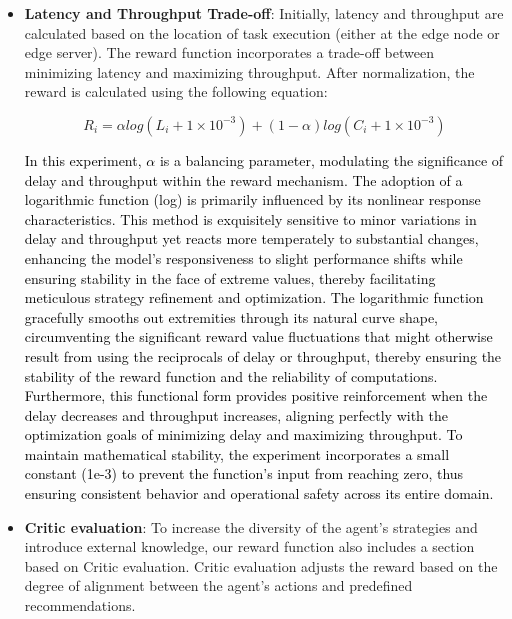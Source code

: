 \documentclass[preprint,12pt]{elsarticle}
\begin{document}
\begin{itemize}

    \item {\fontsize{11}{\baselineskip}\selectfont \textbf{Latency and Throughput Trade-off}}: Initially, latency and throughput are calculated based on the location of task execution (either at the edge node or edge server). The reward function incorporates a trade-off between minimizing latency and maximizing throughput. After normalization, the reward is calculated using the following equation:

        \begin{equation}
            R_i=\alpha log(L_i+1\times 10^{-3})+(1-\alpha)log(C_i+1\times 10^{-3})
        \end{equation}

    \textcolor{black}{In this experiment, \(\alpha\) is a balancing parameter, modulating the significance of delay and throughput within the reward mechanism. The adoption of a logarithmic function (log) is primarily influenced by its nonlinear response characteristics. This method is exquisitely sensitive to minor variations in delay and throughput yet reacts more temperately to substantial changes, enhancing the model's responsiveness to slight performance shifts while ensuring stability in the face of extreme values, thereby facilitating meticulous strategy refinement and optimization. The logarithmic function gracefully smooths out extremities through its natural curve shape, circumventing the significant reward value fluctuations that might otherwise result from using the reciprocals of delay or throughput, thereby ensuring the stability of the reward function and the reliability of computations. Furthermore, this functional form provides positive reinforcement when the delay decreases and throughput increases, aligning perfectly with the optimization goals of minimizing delay and maximizing throughput. To maintain mathematical stability, the experiment incorporates a small constant (1e-3) to prevent the function's input from reaching zero, thus ensuring consistent behavior and operational safety across its entire domain.}

    \item {\fontsize{11}{\baselineskip}\selectfont \textbf{Critic evaluation}}: To increase the diversity of the agent's strategies and introduce external knowledge, our reward function also includes a section based on Critic evaluation. Critic evaluation adjusts the reward based on the degree of alignment between the agent's actions and predefined recommendations.
    

\end{itemize}
\end{document}
